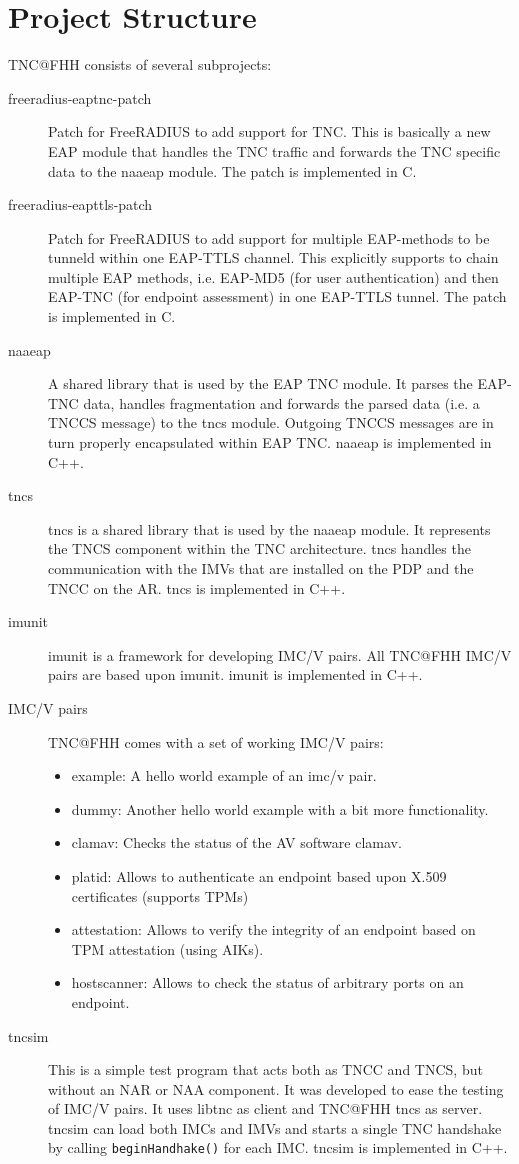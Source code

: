 \documentclass[a4paper,10pt]{scrartcl}
\begin{document}
\section{Project Structure}
TNC@FHH consists of several subprojects:
\begin{description}
    \item[freeradius-eaptnc-patch] Patch for FreeRADIUS to add support for TNC. This is basically a new EAP
    module that handles the TNC traffic and forwards the TNC specific data to the
    naaeap module. The patch is implemented in C.
     \item[freeradius-eapttls-patch] Patch for FreeRADIUS to add support for multiple EAP-methods to be tunneld within one EAP-TTLS channel. This explicitly supports
     to chain multiple EAP methods, i.e. EAP-MD5 (for user authentication) and then EAP-TNC (for endpoint assessment) in one EAP-TTLS tunnel.
     The patch is implemented in C.
    \item[naaeap] A shared library that is used by the EAP TNC module. It parses the EAP-TNC data,
    handles fragmentation and forwards the parsed data (i.e. a TNCCS message) to the tncs module.
    Outgoing TNCCS messages are in turn properly encapsulated within EAP TNC.
    naaeap is implemented in C++.
    \item[tncs] tncs is a shared library that is used by the naaeap module. It represents the
    TNCS component within the TNC architecture. tncs handles the communication with the IMVs that are installed on the PDP and the TNCC on the AR. tncs is implemented in C++.
    \item[imunit] imunit is a framework for developing IMC/V pairs. All TNC@FHH IMC/V pairs are
    based upon imunit. imunit is implemented in C++.
    \item[IMC/V pairs] TNC@FHH comes with a set of working IMC/V pairs:
    \begin{itemize}
    	\item example: A hello world example of an imc/v pair.
    	\item dummy: Another hello world example with a bit more functionality.
    	\item clamav: Checks the status of the AV software clamav.
    	\item platid: Allows to authenticate an endpoint based upon X.509 certificates (supports
        TPMs)
    	\item attestation: Allows to verify the integrity of an endpoint based on TPM attestation (using AIKs).
        \item hostscanner: Allows to check the status of arbitrary ports on an endpoint.
    \end{itemize}
    \item[tncsim] This is a simple test program that acts both as TNCC and TNCS,
    but without an NAR or NAA component. It was developed to ease the testing of
    IMC/V pairs. It uses libtnc as client and TNC@FHH tncs as server. tncsim can
    load both IMCs and IMVs and starts a single TNC handshake by calling
    \texttt{beginHandhake()} for each IMC. tncsim is implemented in C++.
\end{description}
\end{document}
